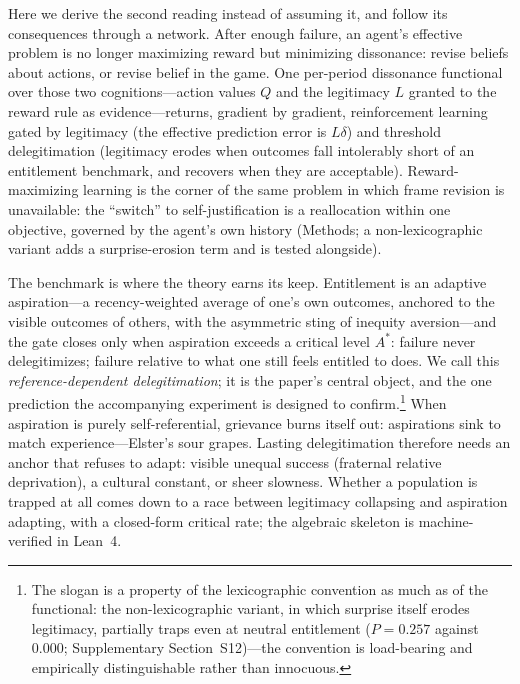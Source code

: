 \documentclass[11pt]{article}
\newcommand{\1}{\mathbf{1}}
\newcommand{\Astar}{A^{*}}
\begin{document}
Here we derive the second reading instead of assuming it, and follow its consequences through a network. After enough failure, an agent's effective problem is no longer maximizing reward but minimizing dissonance: revise beliefs about actions, or revise belief in the game. One per-period dissonance functional over those two cognitions---action values $Q$ and the legitimacy $L$ granted to the reward rule as evidence---returns, gradient by gradient, reinforcement learning gated by legitimacy (the effective prediction error is $L\delta$) and threshold delegitimation (legitimacy erodes when outcomes fall intolerably short of an entitlement benchmark, and recovers when they are acceptable). Reward-maximizing learning is the corner of the same problem in which frame revision is unavailable: the ``switch'' to self-justification is a reallocation within one objective, governed by the agent's own history (Methods; a non-lexicographic variant adds a surprise-erosion term and is tested alongside).

The benchmark is where the theory earns its keep. Entitlement is an adaptive aspiration---a recency-weighted average of one's own outcomes, anchored to the visible outcomes of others\cite{Simon1955,Selten1998,KoszegiRabin2006}, with the asymmetric sting of inequity aversion\cite{FehrSchmidt1999}---and the gate closes only when aspiration exceeds a critical level $\Astar$: failure never delegitimizes; failure relative to what one still feels entitled to does. We call this \emph{reference-dependent delegitimation}; it is the paper's central object, and the one prediction the accompanying experiment is designed to confirm.\footnote{The slogan is a property of the lexicographic convention as much as of the functional: the non-lexicographic variant, in which surprise itself erodes legitimacy, partially traps even at neutral entitlement ($P=0.257$ against $0.000$; Supplementary Section~S12)---the convention is load-bearing and empirically distinguishable rather than innocuous.} When aspiration is purely self-referential, grievance burns itself out: aspirations sink to match experience---Elster's sour grapes\cite{Elster1983}. Lasting delegitimation therefore needs an anchor that refuses to adapt: visible unequal success (fraternal relative deprivation\cite{Runciman1966,Gurr1970,SmithPettigrew2012}), a cultural constant, or sheer slowness. Whether a population is trapped at all comes down to a race between legitimacy collapsing and aspiration adapting, with a closed-form critical rate; the algebraic skeleton is machine-verified in Lean~4\cite{MoultonLean}.
\end{document}

